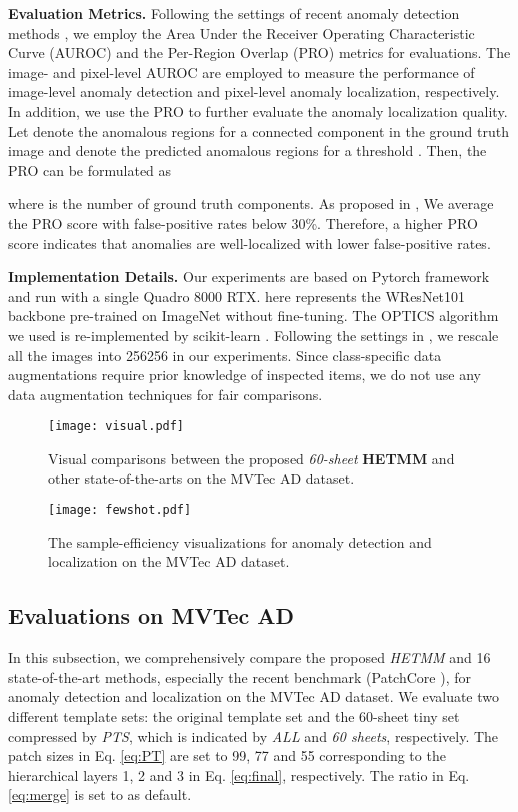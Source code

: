 \documentclass[default,iicol]{sn-jnl}\usepackage[algo2e,ruled,linesnumbered]{algorithm2e}
\theoremstyle{thmstyleone}\newtheorem{theorem}{Theorem}\newtheorem{proposition}[theorem]{Proposition}
\theoremstyle{thmstyletwo}\newtheorem{example}{Example}\newtheorem{remark}{Remark}
\theoremstyle{thmstylethree}\newtheorem{definition}{Definition}
\begin{document}
\noindent\textbf{Evaluation Metrics. }\label{sec:metrics}
Following the settings of recent anomaly detection methods \cite{US,patchcore}, we employ the Area Under the Receiver Operating Characteristic Curve (AUROC) and the Per-Region Overlap (PRO) \cite{MVTEC} metrics for evaluations.
The image- and pixel-level AUROC are employed to measure the performance of image-level anomaly detection and pixel-level anomaly localization, respectively.
In addition, we use the PRO to further evaluate the anomaly localization quality.
Let  denote the anomalous regions for a connected component  in the ground truth image  and  denote the predicted anomalous regions for a threshold .
Then, the PRO can be formulated as

where  is the number of ground truth components.
As proposed in \cite{US}, We average the PRO score with false-positive rates below 30\%.
Therefore, a higher PRO score indicates that anomalies are well-localized with lower false-positive rates.

\noindent\textbf{Implementation Details. }
Our experiments are based on Pytorch \cite{Pytorch} framework and run with a single Quadro 8000 RTX.
 here represents the WResNet101 \cite{wresnet} backbone pre-trained on ImageNet \cite{imagenet} without fine-tuning.
The OPTICS algorithm we used is re-implemented by scikit-learn \cite{scikit-learn}.
Following the settings in \cite{CutPaste}, we rescale all the images into 256256 in our experiments.
Since class-specific data augmentations require prior knowledge of inspected items, we do not use any data augmentation techniques for fair comparisons.

\begin{figure*}[!t]
    \centering
        \texttt{[image: visual.pdf]}
    \caption{Visual comparisons between the proposed \textit{60-sheet} \textbf{HETMM} and other state-of-the-arts on the MVTec AD dataset.
    }
    \label{fig:visual}
\end{figure*}

\begin{figure*}[!t]
    \centering
    \texttt{[image: fewshot.pdf]}
    \caption{
    The sample-efficiency visualizations for anomaly detection and localization on the MVTec AD dataset.
    }
    \label{fig:fewshot}
\end{figure*}

\subsection{Evaluations on MVTec AD} \label{EXP:MVTec}
In this subsection, we comprehensively compare the proposed \textit{HETMM} and 16 state-of-the-art methods, especially the recent benchmark (PatchCore \cite{patchcore}), for anomaly detection and localization on the MVTec AD dataset.
We evaluate two different template sets: the original template set and the 60-sheet tiny set compressed by \textit{PTS}, which is indicated by \textit{ALL} and \textit{60 sheets}, respectively.
The patch sizes in Eq. \ref{eq:PT} are set to 99, 77 and 55 corresponding to the hierarchical layers 1, 2 and 3 in Eq. \ref{eq:final}, respectively.
The ratio  in Eq. \ref{eq:merge} is set to  as default.
\end{document}
